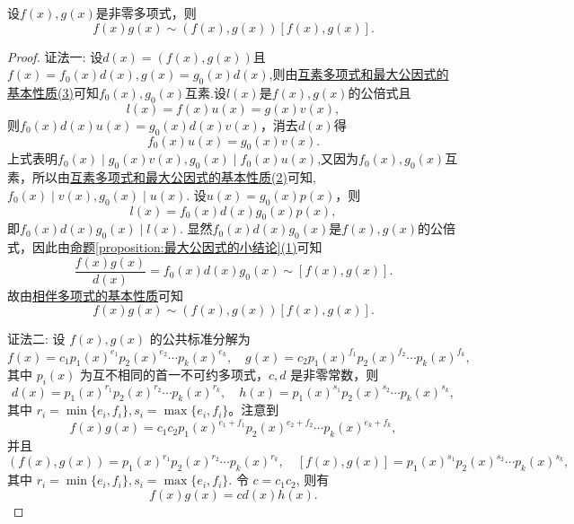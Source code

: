 \documentclass[../../main.tex]{subfiles}%
\begin{document}
\begin{proposition}[两个多项式的乘积与其最大公因式和最小公倍式的乘积相伴]\label{proposition:两个多项式的乘积与其最大公因式和最小公倍式的乘积相伴}
设\(f(x),g(x)\)是非零多项式，则
\[
f(x)g(x)\sim(f(x),g(x))[f(x),g(x)].
\]
\end{proposition}
\begin{proof}

{\color{blue}证法一:}
设\(d(x)=(f(x),g(x))\)且\(f(x)=f_0(x)d(x),g(x)=g_0(x)d(x)\),则由\hyperref[proposition:互素多项式和最大公因式的基本性质]{互素多项式和最大公因式的基本性质(3)}可知\(f_0(x),g_0(x)\)互素.设\(l(x)\)是\(f(x),g(x)\)的公倍式且
\[
l(x)=f(x)u(x)=g(x)v(x),
\]
则\(f_0(x)d(x)u(x)=g_0(x)d(x)v(x)\)，消去\(d(x)\)得
\[
f_0(x)u(x)=g_0(x)v(x).
\]
上式表明$f_0(x)\mid g_0(x)v(x),g_0(x)\mid f_0(x)u(x)$,又因为\(f_0(x),g_0(x)\)互素，所以由\hyperref[proposition:互素多项式和最大公因式的基本性质]{互素多项式和最大公因式的基本性质(2)}可知,\(f_0(x)\mid v(x),g_0(x)\mid u(x)\). 设\(u(x)=g_0(x)p(x)\)，则
\[
l(x)=f_0(x)d(x)g_0(x)p(x),
\]
即\(f_0(x)d(x)g_0(x)\mid l(x)\). 显然\(f_0(x)d(x)g_0(x)\)是\(f(x),g(x)\)的公倍式，因此由\hyperref[proposition:最大公因式的小结论]{命题\ref{proposition:最大公因式的小结论}(1)}可知
\[
\frac{f(x)g(x)}{d(x)}=f_0(x)d(x)g_0(x)\sim[f(x),g(x)].
\]
故由\hyperref[proposition:相伴多项式的基本性质]{相伴多项式的基本性质}可知
\[
f(x)g(x)\sim(f(x),g(x))[f(x),g(x)].
\]

{\color{blue}证法二:}
设 \(f(x), g(x)\) 的公共标准分解为
\[
f(x) = c_1 p_1(x)^{e_1}p_2(x)^{e_2} \cdots p_k(x)^{e_k}, \quad g(x) = c_2 p_1(x)^{f_1}p_2(x)^{f_2} \cdots p_k(x)^{f_k},
\]
其中 \(p_i(x)\) 为互不相同的首一不可约多项式，\(c, d\) 是非零常数，则
\[
d(x) = p_1(x)^{r_1}p_2(x)^{r_2} \cdots p_k(x)^{r_k}, \quad h(x) = p_1(x)^{s_1}p_2(x)^{s_2} \cdots p_k(x)^{s_k},
\]
其中 \(r_i = \min\{e_i, f_i\}, s_i = \max\{e_i, f_i\}\)。注意到
\[
f(x)g(x) = c_1c_2 p_1(x)^{e_1 + f_1}p_2(x)^{e_2 + f_2} \cdots p_k(x)^{e_k + f_k},
\]
并且
\[
(f(x), g(x)) = p_1(x)^{r_1}p_2(x)^{r_2} \cdots p_k(x)^{r_k}, \quad [f(x), g(x)] = p_1(x)^{s_1}p_2(x)^{s_2} \cdots p_k(x)^{s_k},
\]
其中 \(r_i = \min\{e_i, f_i\}, s_i = \max\{e_i, f_i\}\). 令 \(c = c_1c_2\), 则有
\[
f(x)g(x) = cd(x)h(x).
\]

\end{proof}
\end{document}
